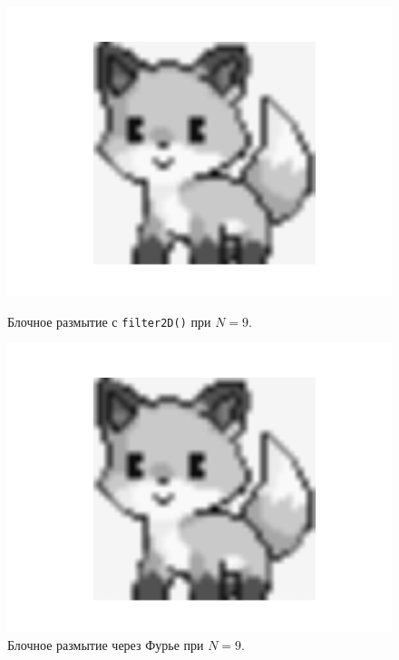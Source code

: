 \documentclass[a4paper]{article}
\begin{document}
\begin{figure}[H]
  \centering
  \begin{minipage}{0.49\textwidth}
    \centering
    \includegraphics[width=\textwidth]{src/box_9.png}
    \caption{Блочное размытие с \texttt{filter2D()} при $N=9$.}
  \end{minipage}
  \begin{minipage}{0.49\textwidth}
    \centering
    \includegraphics[width=\textwidth]{src/ifft_box_9.png}
    \caption{Блочное размытие через Фурье при $N=9$.}
  \end{minipage}
\end{figure}
\end{document}
